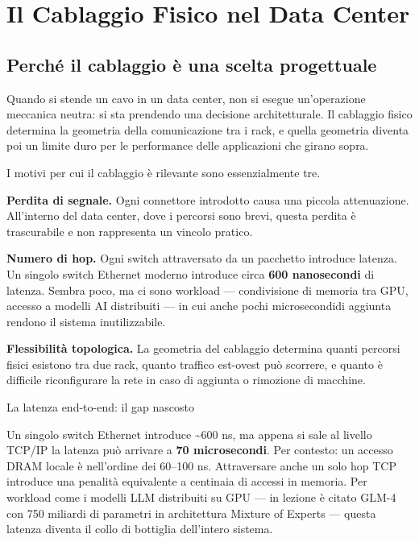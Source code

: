 \documentclass[
  italian,
  openany]{book}
\begin{document}
\section{Il Cablaggio Fisico nel Data
Center}\label{il-cablaggio-fisico-nel-data-center}

\subsection{Perché il cablaggio è una scelta
progettuale}\label{perchuxe9-il-cablaggio-uxe8-una-scelta-progettuale}

Quando si stende un cavo in un data center, non si esegue un'operazione
meccanica neutra: si sta prendendo una decisione architetturale. Il
cablaggio fisico determina la geometria della comunicazione tra i rack,
e quella geometria diventa poi un limite duro per le performance delle
applicazioni che girano sopra.

I motivi per cui il cablaggio è rilevante sono essenzialmente tre.

\textbf{Perdita di segnale.} Ogni connettore introdotto causa una
piccola attenuazione. All'interno del data center, dove i percorsi sono
brevi, questa perdita è trascurabile e non rappresenta un vincolo
pratico.

\textbf{Numero di hop.} Ogni switch attraversato da un pacchetto
introduce latenza. Un singolo switch Ethernet moderno introduce circa
\textbf{600 nanosecondi} di latenza. Sembra poco, ma ci sono workload
--- condivisione di memoria tra GPU, accesso a modelli AI distribuiti
--- in cui anche pochi microsecondidi aggiunta rendono il sistema
inutilizzabile.

\textbf{Flessibilità topologica.} La geometria del cablaggio determina
quanti percorsi fisici esistono tra due rack, quanto traffico est-ovest
può scorrere, e quanto è difficile riconfigurare la rete in caso di
aggiunta o rimozione di macchine.

\begin{callouttip}{La latenza end-to-end: il gap nascosto}

Un singolo switch Ethernet introduce \textasciitilde600 ns, ma appena si
sale al livello TCP/IP la latenza può arrivare a \textbf{70
microsecondi}. Per contesto: un accesso DRAM locale è nell'ordine dei
60--100 ns. Attraversare anche un solo hop TCP introduce una penalità
equivalente a centinaia di accessi in memoria. Per workload come i
modelli LLM distribuiti su GPU --- in lezione è citato GLM-4 con 750
miliardi di parametri in architettura Mixture of Experts --- questa
latenza diventa il collo di bottiglia dell'intero sistema.

\end{callouttip}
\end{document}
